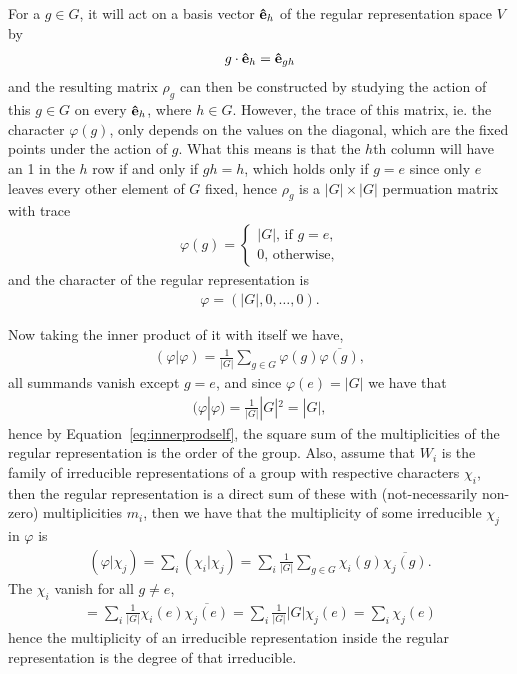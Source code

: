 For a $g \in G$, it will act on a basis vector $\mathbf{\hat{e}}_h$ of the regular representation space $V$ by
\begin{align*}
	g \cdot \mathbf{\hat{e}}_{h} = \mathbf{\hat{e}}_{gh}
\end{align*}
and the resulting matrix $\rho_g$ can then be constructed by studying the action of this $g \in G$ on every $\mathbf{\hat{e}}_h$, where $h \in G$. However, the trace of this matrix, ie. the character $\varphi(g)$, only depends on the values on the diagonal, which are the fixed points under the action of $g$. What this means is that the $h$th column will have an 1 in the $h$ row if and only if $gh = h$, which holds only if $g = e$ since only $e$ leaves every other element of $G$ fixed, hence $\rho_g$ is a $|G| \times |G|$ permuation matrix with trace
\begin{align*}
	\varphi(g) = \begin{cases}
		|G| \text{, if $g = e$,} \\
		0 \text{, otherwise,}
	\end{cases}
\end{align*}
and the character of the regular representation is 
\begin{align*}
	\varphi = (|G|, 0, \dots, 0).
\end{align*}

Now taking the inner product of it with itself we have,
\begin{align*}
	(\varphi|\varphi) = \frac{1}{|G|} \sum_{g \in G} \varphi(g)\overline{\varphi(g)},
\end{align*}
all summands vanish except $g = e$, and since $\varphi(e) = |G|$ we have that
\begin{align*}
	(\varphi|\varphi) = \frac{1}{|G|} |G|^2 = |G|,
\end{align*}
hence by Equation~\ref{eq:innerprodself}, the square sum of the multiplicities of the regular representation is the order of the group. Also, assume that ${W_i}$ is the family of irreducible representations of a group with respective characters $\chi_i$, then the regular representation is a direct sum of these with (not-necessarily non-zero) multiplicities $m_i$, then we have that the multiplicity of some irreducible $\chi_j$ in $\varphi$ is
\begin{align*}
	(\varphi|\chi_j) = \sum_i (\chi_i|\chi_j) = \sum_i \frac{1}{|G|} \sum_{g \in G} \chi_i(g) \overline{\chi_j(g)}.
\end{align*}
The $\chi_i$ vanish for all $g \neq e$, 
\begin{align*}
	= \sum_i \frac{1}{|G|} \chi_i(e) \overline{\chi_j(e)} = \sum_i \frac{1}{|G|}|G|\chi_j(e) = \sum_i \chi_j(e)
\end{align*}
hence the multiplicity of an irreducible representation inside the regular representation is the degree of that irreducible.

